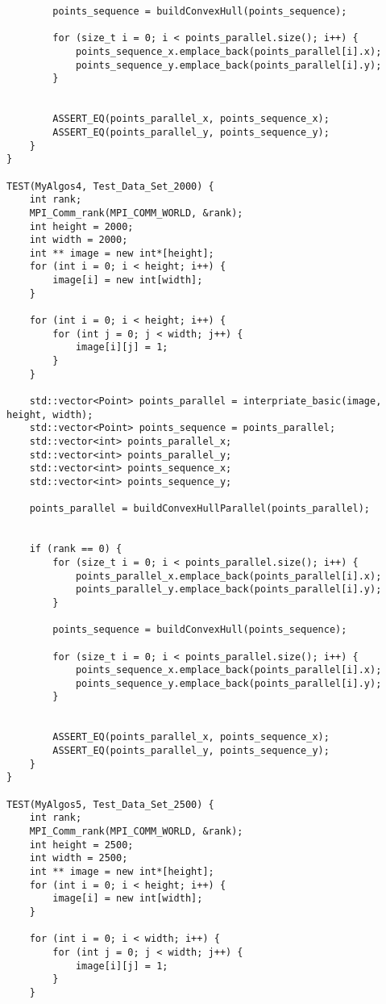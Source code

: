 \documentclass{report}
\begin{document}
\begin{lstlisting}
        points_sequence = buildConvexHull(points_sequence);

        for (size_t i = 0; i < points_parallel.size(); i++) {
            points_sequence_x.emplace_back(points_parallel[i].x);
            points_sequence_y.emplace_back(points_parallel[i].y);
        }


        ASSERT_EQ(points_parallel_x, points_sequence_x);
        ASSERT_EQ(points_parallel_y, points_sequence_y);
    }
}

TEST(MyAlgos4, Test_Data_Set_2000) {
    int rank;
    MPI_Comm_rank(MPI_COMM_WORLD, &rank);
    int height = 2000;
    int width = 2000;
    int ** image = new int*[height];
    for (int i = 0; i < height; i++) {
        image[i] = new int[width];
    }

    for (int i = 0; i < height; i++) {
        for (int j = 0; j < width; j++) {
            image[i][j] = 1;
        }
    }

    std::vector<Point> points_parallel = interpriate_basic(image, height, width);
    std::vector<Point> points_sequence = points_parallel;
    std::vector<int> points_parallel_x;
    std::vector<int> points_parallel_y;
    std::vector<int> points_sequence_x;
    std::vector<int> points_sequence_y;

    points_parallel = buildConvexHullParallel(points_parallel);


    if (rank == 0) {
        for (size_t i = 0; i < points_parallel.size(); i++) {
            points_parallel_x.emplace_back(points_parallel[i].x);
            points_parallel_y.emplace_back(points_parallel[i].y);
        }

        points_sequence = buildConvexHull(points_sequence);

        for (size_t i = 0; i < points_parallel.size(); i++) {
            points_sequence_x.emplace_back(points_parallel[i].x);
            points_sequence_y.emplace_back(points_parallel[i].y);
        }


        ASSERT_EQ(points_parallel_x, points_sequence_x);
        ASSERT_EQ(points_parallel_y, points_sequence_y);
    }
}

TEST(MyAlgos5, Test_Data_Set_2500) {
    int rank;
    MPI_Comm_rank(MPI_COMM_WORLD, &rank);
    int height = 2500;
    int width = 2500;
    int ** image = new int*[height];
    for (int i = 0; i < height; i++) {
        image[i] = new int[width];
    }

    for (int i = 0; i < width; i++) {
        for (int j = 0; j < width; j++) {
            image[i][j] = 1;
        }
    }


\end{lstlisting}
\end{document}
